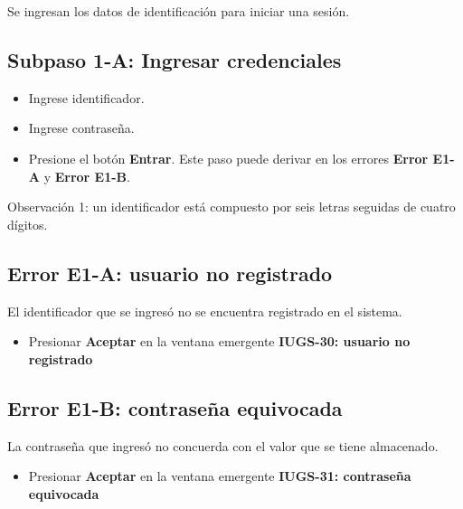 Se ingresan los datos de identificación para iniciar una sesión.
\subsection{Subpaso 1-A: Ingresar credenciales}
\begin{itemize}
	\item Ingrese identificador.
	\item Ingrese contraseña.
	\item Presione el botón \textbf{Entrar}. Este paso puede derivar
		en los errores \textbf{Error E1-A} y \textbf{Error E1-B}.
\end{itemize}
Observación 1: un identificador está compuesto por seis letras seguidas
	de cuatro dígitos.

\subsection{Error E1-A: usuario no registrado}
El identificador que se ingresó no se encuentra registrado en el sistema.
\begin{itemize}
	\item Presionar \textbf{Aceptar} en la ventana emergente 
		\textbf{IUGS-30: usuario no registrado}
\end{itemize}

\subsection{Error E1-B: contraseña equivocada}
La contraseña que ingresó no concuerda con el valor que se tiene almacenado.
\begin{itemize}
	\item Presionar \textbf{Aceptar} en la ventana emergente 
		\textbf{IUGS-31: contraseña equivocada}
\end{itemize}
